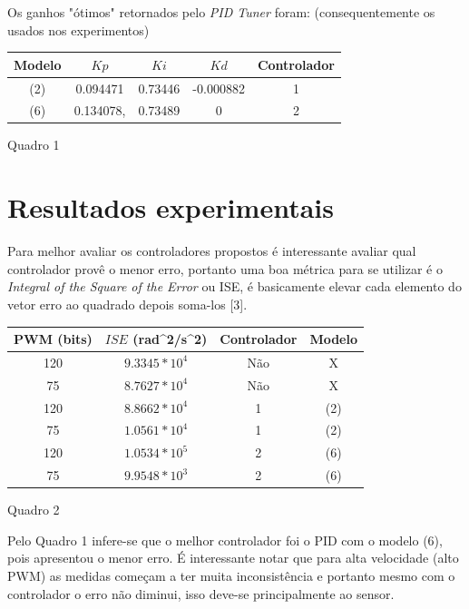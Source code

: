 \documentclass{article}
\begin{document}
    Os ganhos "ótimos" retornados pelo \textit{PID Tuner} foram: (consequentemente os usados nos experimentos)
    \begin{center}
    \begin{tabular}{|c|c|c|c|c|}
            \hline
            Modelo & $Kp$ & $Ki$ & $Kd$ & Controlador \\
            \hline
            (2) & 0.094471 &  0.73446 & -0.000882 & 1 \\
            \hline
            (6) & 0.134078, & 0.73489 & 0 & 2 \\
            \hline
    \end{tabular}
    
  \caption{Quadro 1}
\end{center}
    

    
\section{Resultados experimentais}

Para melhor avaliar os controladores propostos é interessante avaliar qual controlador provê o menor erro, portanto uma boa métrica para se utilizar é o \textit{Integral of the Square of the Error} ou ISE, é basicamente elevar cada elemento do vetor erro ao quadrado depois soma-los [3].

\begin{center}
    \begin{tabular}{|c|c|c|c|}
            \hline
            PWM (bits) & $ISE$ (rad^2/s^2) & Controlador & Modelo \\
            \hline
            120 & $9.3345*10^4$ & Não & X \\
            \hline
            75 & $8.7627*10^4$ & Não & X \\
            \hline
            120 & $8.8662*10^4$ & 1 & (2) \\
            \hline
            75 & $1.0561*10^4$ & 1 & (2)\\
            \hline
            120 & $1.0534*10^5$ & 2 & (6) \\
            \hline
            75 & $9.9548*10^3$ & 2 & (6)\\
            \hline
    \end{tabular}
    
  \caption{Quadro 2}
\end{center}

Pelo Quadro 1 infere-se que o melhor controlador foi o PID com o modelo (6), pois apresentou o menor erro. É interessante notar que para alta velocidade (alto PWM) as medidas começam a ter muita inconsistência e portanto mesmo com o controlador o erro não diminui, isso deve-se principalmente ao sensor.
\end{document}
